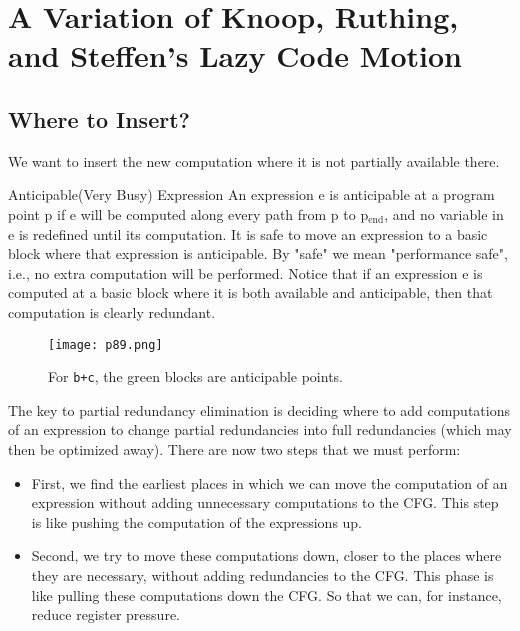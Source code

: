 \newpage

\section{A Variation of Knoop, Ruthing, and Steffen’s Lazy Code Motion}
\subsection{Where	to	Insert?	}

We want to insert the new computation where it is not partially available there.


\begin{definition}{Anticipable(Very Busy) Expression}
    An	expression	e	is	anticipable	at	a	program	point	p	
    if	e will	be	computed	along	every	path	from	
    p	to	p$_{\mathrm{end}}$,	and	no	 variable	in	e	is	
    redefined	until	its	computation. It	is	safe	to	move	
    an	expression	to	a	basic	block	where	
    that	expression	is	anticipable. By	"safe"	we	mean	
    "performance	safe",	i.e.,	no	extra computation	
    will	be	performed.	Notice	that	if	an	expression	
    e	is	computed	at	a	basic block	where	it	is	both     available
    and	anticipable,	then	that	
    computation	is	clearly	redundant.		

    \begin{figure}[H]
        \centering
         \texttt{[image: p89.png]}
             \caption{For \texttt{b+c}, the {\color{green}green} blocks are anticipable points. }
             \label{fig:p89}
    \end{figure}
\end{definition}



The key to partial redundancy
elimination is deciding where to add
computations of an expression to
change partial redundancies into full
redundancies (which may then be
optimized away). There	are	now	two	steps	that	we	must	
perform:

\begin{itemize}
\item First,	we	find	the	earliest	places	in	which	
we	can	move	the	computation	of	an	
expression	without	adding	unnecessary	
computations	to	the	CFG.	This	step	is	like	
pushing	the	computation	of	the	
expressions	up.	
\item Second,	we	try	to	move	these	
computations	down,	closer	to	the	places	
where	they	are	necessary,	without	adding	
redundancies	to	the	CFG.	This	phase	is	like	
pulling	these	computations	down	the	CFG. So	that	we	can,	
for	instance,	reduce	register	
pressure.
\end{itemize}

